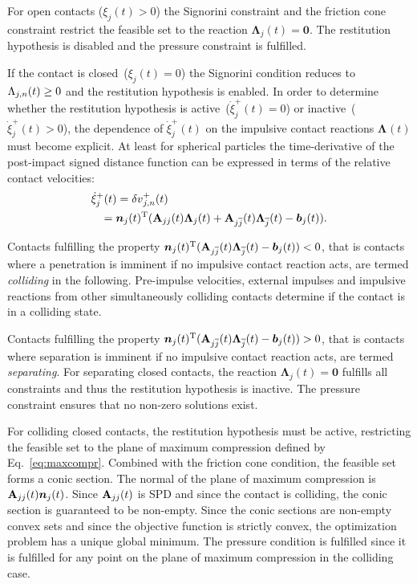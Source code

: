 \documentclass[global,twocolumn]{svjour}
\let\vec\bm
\newcommand{\vectoscalar}[1]{{\renewcommand{\vec}{}#1}}
\newcommand{\mat}[1]{{\bf #1}}
\newcommand{\transp}{{\mathrm{T}}}
\newcommand{\contactimpulse}[1]{\ensuremath{\vec{\Lambda}_{#1}}}
\newcommand{\contactimpulseCFn}[1]{\ensuremath{\vectoscalar{\contactimpulse{\ifstrequal{#1}{}{n}{#1,n}}}}}
\newcommand{\postrelvel}[1]{\ensuremath{{\vec{\delta v}_{#1}^+}}}
\newcommand{\postrelvelCFn}[1]{\ensuremath{\vectoscalar{\postrelvel{\ifstrequal{#1}{}{n}{#1,n}}}}}
\begin{document}
		For open contacts ($\xi_j(t) > 0$) the Signorini constraint and the
		friction cone constraint restrict the feasible set to the reaction
		$\contactimpulse{j}(t) = \vec 0$. The restitution hypothesis is disabled and the
		pressure constraint is fulfilled.

		If the contact is closed~($\xi_j(t) = 0$) the Signorini condition
		reduces to $\contactimpulseCFn{j}(t) \geq 0$ and the restitution hypothesis is
		enabled. In order to determine whether the restitution hypothesis is
		active~($\dot{\xi}_j^+(t) = 0$) or inactive~($\dot{\xi}_j^+(t) > 0$),
		the dependence of $\dot{\xi}_j^+(t)$ on the impulsive contact reactions
		$\contactimpulse{}(t)$ must become explicit. At least for spherical
		particles the time-derivative of the post-impact signed distance
		function can be expressed in terms of the relative contact
		velocities:
		\begin{equation}
			\begin{split}
				\dot{\xi}_j^+(t) & = \postrelvelCFn{j}(t)\\
				                 & \hspace{-0.5cm} = \vec n_j(t)^\transp (\mat{A}_{jj}(t) \contactimpulse{j}(t) + \mat{A}_{j\overline{j}}(t) \contactimpulse{\overline{j}}(t) - \vec b_j(t)).
			\end{split}
			\label{eq:maxcompr}
		\end{equation}

		Contacts fulfilling the property
		$\vec n_j(t)^\transp (\mat{A}_{j\overline{j}}(t) \contactimpulse{\overline{j}}(t) - \vec b_j(t)) < 0$,
		that is contacts where a penetration is imminent if no impulsive contact
		reaction acts, are termed \emph{colliding} in the following. Pre-impulse
		velocities, external impulses and impulsive reactions from other
		simultaneously colliding contacts determine if the contact is in a
		colliding state.

		Contacts fulfilling the property $\vec n_j(t)^\transp (\mat{A}_{j\overline{j}}(t) \contactimpulse{\overline{j}}(t) - \vec b_j(t)) > 0$,
		that is contacts where separation is imminent if no impulsive contact reaction acts, are
		termed \emph{separating}. For separating closed contacts, the reaction $\contactimpulse{j}(t) = \vec 0$
		fulfills all constraints and thus the restitution hypothesis is inactive. The
		pressure constraint ensures that no non-zero solutions exist.
		
		For colliding closed contacts, the restitution hypothesis must be active,
		restricting the feasible set to the plane of maximum compression
		defined by Eq.~\eqref{eq:maxcompr}. Combined with the friction cone
		condition, the feasible set forms a conic section. The normal of the
		plane of maximum compression is $\mat{A}_{jj}(t) \vec n_j(t)$. Since
		$\mat{A}_{jj}(t)$ is SPD and since the contact is colliding, the conic
		section is guaranteed to be non-empty. Since the conic sections are
		non-empty convex sets and since the objective function is strictly
		convex, the optimization problem has a unique global minimum. The
		pressure condition is fulfilled since it is fulfilled for any point on
		the plane of maximum compression in the colliding case.
		
\end{document}
